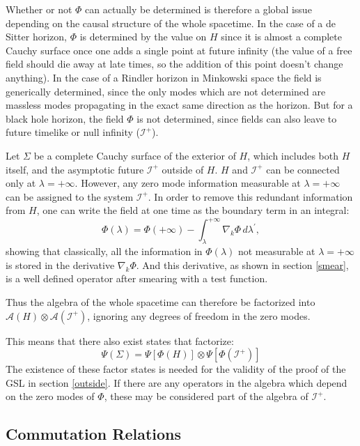 \documentclass[12pt]{article}
\begin{document}
Whether or not $\Phi$ can actually be determined is therefore a global issue depending on the causal structure of the whole spacetime.  In the case of a de Sitter horizon, $\Phi$ is determined by the value on $H$ since it is almost a complete Cauchy surface once one adds a single point at future infinity (the value of a free field should die away at late times, so the addition of this point doesn't change anything).  In the case of a Rindler horizon in Minkowski space the field is generically determined, since the only modes which are not determined are massless modes propagating in the exact same direction as the horizon.  But for a black hole horizon, the field $\Phi$ is not determined, since fields can also leave to future timelike or null infinity ($\mathcal{I}^+$).

Let $\Sigma$ be a complete Cauchy surface of the exterior of $H$, which includes both $H$ itself, and the asymptotic future $\mathcal{I}^+$ outside of $H$.  $H$ and $\mathcal{I}^+$ can be connected only at $\lambda = +\infty$.  However, any zero mode information measurable at $\lambda = +\infty$ can be assigned to the system $\mathcal{I}^+$.  In order to remove this redundant information from $H$, one can write the field at one time as the boundary term in an integral:
\begin{equation}\label{break}
\Phi(\lambda) =  \Phi(+\infty) - \int^{+\infty}_{\lambda} \nabla_k \Phi\,d\lambda^\prime,
\end{equation}
showing that classically, all the information in $\Phi(\lambda)$ not measurable at $\lambda = +\infty$ is stored in the derivative $\nabla_k \Phi$.  And this derivative, as shown in section \ref{smear}, is a well defined operator after smearing with a test function.

Thus the algebra of the whole spacetime can therefore be factorized into $\mathcal{A}(H) \otimes \mathcal{A}{(\mathcal{I}^+)}$, ignoring any degrees of freedom in the zero modes.

This means that there also exist states that factorize:
\begin{equation}\label{factor}
\Psi(\Sigma) = \Psi[\Phi(H)] \otimes \Psi[\Phi(\mathcal{I}^+)]
\end{equation}
The existence of these factor states is needed for the validity of the proof of the GSL in section \ref{outside}.  If there are any operators in the algebra which depend on the zero modes of $\Phi$, these may be considered part of the algebra of $\mathcal{I}^+$.

\subsection{Commutation Relations}
\end{document}
